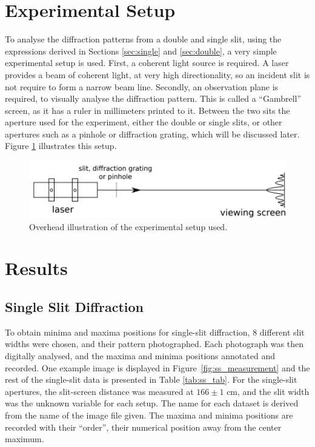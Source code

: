 \documentclass[a4paper]{article}
\begin{document}
\section{Experimental Setup}

To analyse the diffraction patterns from a double and single slit, using the expressions derived in Sections \ref{sec:single} and \ref{sec:double}, a very simple experimental setup is used. First, a coherent light source is required. A laser provides a beam of coherent light, at very high directionality, so an incident slit is not require to form a narrow beam line. Secondly, an observation plane is required, to visually analyse the diffraction pattern. This is called a ``Gambrell'' screen, as it has a ruler in millimeters printed to it. Between the two sits the aperture used for the experiment, either the double or single slits, or other apertures such as a pinhole or diffraction grating, which will be discussed later. Figure \ref{fig:setup} illustrates this setup.

\begin{figure}[h]
  \centerline{\includegraphics[scale=0.4]{setup.png}}
  \captionsetup{justification=centering}
  \caption{Overhead illustration of the experimental setup used.}
  \label{fig:setup}
\end{figure}

\section{Results}

\subsection{Single Slit Diffraction}

To obtain minima and maxima positions for single-slit diffraction, 8 different slit widths were chosen, and their pattern photographed. Each photograph was then digitally analysed, and the maxima and minima positions annotated and recorded. One example image is displayed in Figure~\ref{fig:ss_measurement} and the rest of the single-slit data is presented in Table \ref{tab:ss_tab}. For the single-slit apertures, the slit-screen distance was measured at $166\pm1$ cm, and the slit width was the unknown variable for each setup. The name for each dataset is derived from the name of the image file given. The maxima and minima positions are recorded with their ``order'', their numerical position away from the center maximum.
\end{document}
